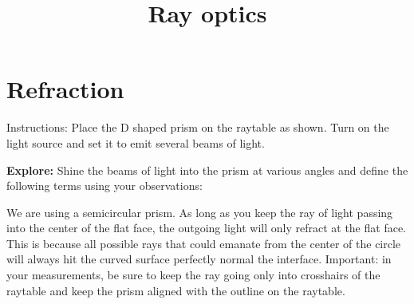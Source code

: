 \documentclass{handout}
\title{Ray optics}
\begin{document}
\maketitle

\section{Refraction}

Instructions: Place the D shaped prism on the raytable as shown. Turn on the light source and set it to emit several beams of light.
\begin{questions}
    \question \textbf{Explore:} Shine the beams of light into the prism at various angles and define the following terms using your observations:

\end{questions}
We are using a semicircular prism. As long as you keep the ray of light passing into the center of the flat face, the outgoing light will only refract at the flat face. This is because all possible rays that could emanate from the center of the circle will always hit the curved surface perfectly normal the interface. Important: in your measurements, be sure to keep the ray going only into crosshairs of the raytable and keep the prism aligned with the outline on the raytable.
\end{document}
